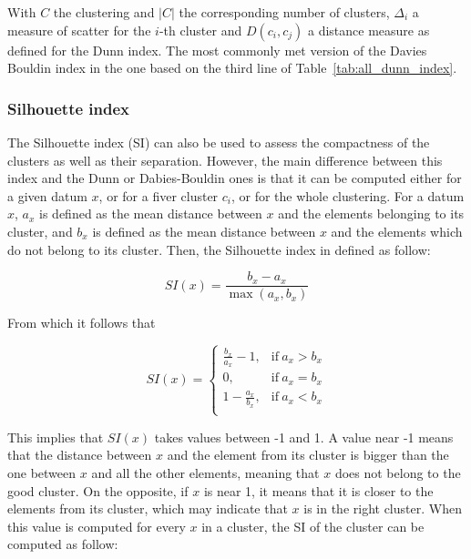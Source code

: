 \documentclass[a4paper]{report}
\begin{document}
    With $C$ the clustering and $|C|$ the corresponding number of clusters, $\Delta_i$ a measure of scatter for the $i$-th cluster and $D(c_i, c_j)$ a distance measure as defined for the Dunn index. The most commonly met version of the Davies Bouldin index in the one based on the third line of Table~\ref{tab:all_dunn_index}.

    \subsubsection{Silhouette index}
    The Silhouette index (SI) can also be used to assess the compactness of the clusters as well as their separation. However, the main difference between this index and the Dunn or Dabies-Bouldin ones is that it can be computed either for a given datum $x$, or for a fiver cluster $c_i$, or for the whole clustering. For a datum $x$, $a_x$ is defined as the mean distance between $x$ and the elements belonging to its cluster, and $b_x$ is defined as the mean distance between $x$ and the elements which do not belong to its cluster. Then, the Silhouette index in defined as follow:

    \begin{equation}
        SI(x) = \frac{b_x - a_x}{\max(a_x, b_x)}
        \label{eq:si_x}
    \end{equation}

    From which it follows that 

    \begin{equation}
        SI(x) = 
        \begin{cases}
            \frac{b_x}{a_x} - 1, & \text{if}\ a_x > b_x \\
            0, & \text{if}\ a_x = b_x \\
            1 - \frac{a_x}{b_x}, & \text{if}\ a_x < b_x \\
        \end{cases}
        \label{eq:si_x_detail}
    \end{equation}

    This implies that $SI(x)$ takes values between -1 and 1. A value near -1 means that the distance between $x$ and the element from its cluster is bigger than the one between $x$ and all the other elements, meaning that $x$ does not belong to the good cluster. On the opposite, if $x$ is near 1, it means that it is closer to the elements from its cluster, which may indicate that $x$ is in the right cluster. When this value is computed for every $x$ in a cluster, the SI of the cluster can be computed as follow:
\end{document}
